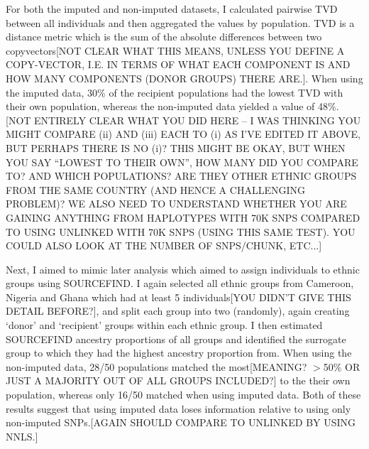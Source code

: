 For both the imputed and non-imputed datasets, I calculated pairwise TVD between all individuals and then aggregated the values by population. TVD is a distance metric which is the sum of the absolute differences between two copyvectors[NOT CLEAR WHAT THIS MEANS, UNLESS YOU DEFINE A COPY-VECTOR, I.E. IN TERMS OF WHAT EACH COMPONENT IS AND HOW MANY COMPONENTS (DONOR GROUPS) THERE ARE.]. When using the imputed data, 30\% of the recipient populations had the lowest TVD with their own population, whereas the non-imputed data yielded a value of 48\%.[NOT ENTIRELY CLEAR WHAT YOU DID HERE -- I WAS THINKING YOU MIGHT COMPARE (ii) AND (iii) EACH TO (i) AS I'VE EDITED IT ABOVE, BUT PERHAPS THERE IS NO (i)? THIS MIGHT BE OKAY, BUT WHEN YOU SAY ``LOWEST TO THEIR OWN'', HOW MANY DID YOU COMPARE TO? AND WHICH POPULATIONS? ARE THEY OTHER ETHNIC GROUPS FROM THE SAME COUNTRY (AND HENCE A CHALLENGING PROBLEM)? WE ALSO NEED TO UNDERSTAND WHETHER YOU ARE GAINING ANYTHING FROM HAPLOTYPES WITH 70K SNPS COMPARED TO USING UNLINKED WITH 70K SNPS (USING THIS SAME TEST). YOU COULD ALSO LOOK AT THE NUMBER OF SNPS/CHUNK, ETC...]

Next, I aimed to mimic later analysis which aimed to assign individuals to ethnic groups using SOURCEFIND. I again selected all ethnic groups from Cameroon, Nigeria and Ghana {\color{red}which had at least 5 individuals[YOU DIDN'T GIVE THIS DETAIL BEFORE?]}, and split each group into two (randomly), again creating `donor' and `recipient' groups within each ethnic group. I then estimated SOURCEFIND ancestry proportions of all groups and identified the surrogate group to which they had the highest ancestry proportion from. When using the non-imputed data, 28/50 populations matched the most{\color{red}[MEANING? $>$50\% OR JUST A MAJORITY OUT OF ALL GROUPS INCLUDED?]} to the their own population, whereas only 16/50 matched when using imputed data. Both of these results suggest that using imputed data loses information relative to using only non-imputed SNPs.{\color{red}[AGAIN SHOULD COMPARE TO UNLINKED BY USING NNLS.]}

